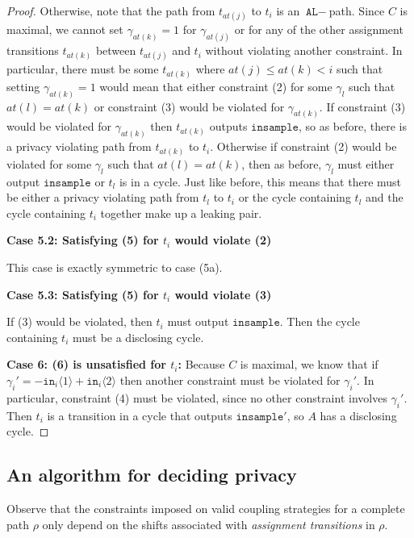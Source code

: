 \documentclass[12pt]{article}
\newcommand{\brangle}[1]{\langle #1 \rangle}
\theoremstyle{definition}
\begin{document}
\begin{proof}
    Otherwise, note that the path from $t_{at(j)}$ to $t_i$ is an $\texttt{AL}-$path. Since $C$ is maximal, we cannot set $\gamma_{at(k)}=1$ for $\gamma_{at(j)}$ or for any of the other assignment transitions $t_{at(k)}$ between $t_{at(j)}$ and $t_i$ without violating another constraint. 
    In particular, there must be some $t_{at(k)}$ where $at(j)\leq at(k)<i$ such that setting $\gamma_{at(k)} = 1$ would mean that either constraint (2) for some $\gamma_l$ such that $at(l) = at(k)$ or constraint (3) would be violated for $\gamma_{at(k)}$. 
    If constraint (3) would be violated for $\gamma_{at(k)}$ then $t_{at(k)}$ outputs $\texttt{insample}$, so as before, there is a privacy violating path from $t_{at(k)}$ to $t_i$. Otherwise if constraint (2) would be violated for some $\gamma_l$ such that $at(l) = at(k)$, then as before, $\gamma_l$ must either output $\texttt{insample}$ or $t_l$ is in a cycle. 
    Just like before, this means that there must be either a privacy violating path from $t_l$ to $t_i$ or the cycle containing $t_l$ and the cycle containing $t_i$ together make up a leaking pair. 

    \textbf{Case 5.2: Satisfying (5) for $t_i$ would violate (2)}

    This case is exactly symmetric to case (5a).

    \textbf{Case 5.3: Satisfying (5) for $t_i$ would violate (3)}

    If (3) would be violated, then $t_i$ must output $\texttt{insample}$. Then the cycle containing $t_i$ must be a disclosing cycle. 
    
    \textbf{Case 6: (6) is unsatisfied for $t_i$:} Because $C$ is maximal, we know that if $\gamma_i' = -\texttt{in}_i\brangle{1}+\texttt{in}_i\brangle{2}$ then another constraint must be violated for $\gamma_i'$. In particular, constraint (4) must be violated, since no other constraint involves $\gamma_i'$. 
    Then $t_i$ is a transition in a cycle that outputs $\texttt{insample}'$, so $A$ has a disclosing cycle.
\end{proof}


\subsection{An algorithm for deciding privacy}

Observe that the constraints imposed on valid coupling strategies for a complete path $\rho$ only depend on the shifts associated with \textit{assignment transitions} in $\rho$. 
\end{document}
